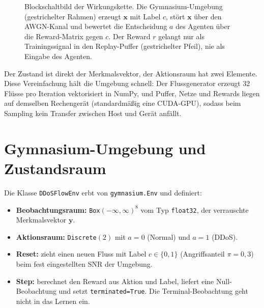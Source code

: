 \begin{figure}[htbp]
	\caption[Blockschaltbild der Wirkungskette]{Blockschaltbild der Wirkungskette. Die Gymnasium-Umgebung (gestrichelter Rahmen) erzeugt $\mathbf{x}$ mit Label $c$, stört $\mathbf{x}$ über den AWGN-Kanal und bewertet die Entscheidung $a$ des Agenten über die Reward-Matrix gegen $c$. Der Reward $r$ gelangt nur als Trainingssignal in den Replay-Puffer (gestrichelter Pfeil), nie als Eingabe des Agenten.}
	\label{fig:blockschaltbild}
\end{figure}

Der Zustand ist direkt der Merkmalsvektor, der Aktionsraum hat zwei Elemente. Diese Vereinfachung hält die Umgebung schnell: Der Flussgenerator erzeugt 32 Flüsse pro Iteration vektorisiert in NumPy, und Puffer, Netze und Rewards liegen auf demselben Rechengerät (standardmäßig eine CUDA-GPU), sodass beim Sampling kein Transfer zwischen Host und Gerät anfällt.

\section{Gymnasium-Umgebung und Zustandsraum}
\label{sec:gymnasium_umgebung}

Die Klasse \texttt{DDoSFlowEnv} erbt von \texttt{gymnasium.Env} und definiert:

\begin{itemize}
	\item \textbf{Beobachtungsraum:} \texttt{Box}$(-\infty,\infty)^{8}$ vom Typ \texttt{float32}, der verrauschte Merkmalsvektor $\mathbf{y}$.
	\item \textbf{Aktionsraum:} \texttt{Discrete}$(2)$ mit $a=0$ (Normal) und $a=1$ (DDoS).
	\item \textbf{Reset:} zieht einen neuen Fluss mit Label $c\in\{0,1\}$ (Angriffsanteil $\pi=0{,}3$) beim fest eingestellten SNR der Umgebung.
	\item \textbf{Step:} berechnet den Reward aus Aktion und Label, liefert eine Null-Beobachtung und setzt \texttt{terminated=True}. Die Terminal-Beobachtung geht nicht in das Lernen ein.
\end{itemize}

